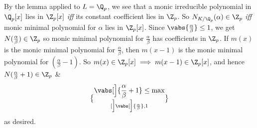 By the lemma applied to $L=\Q_p$, we see that a monic irreducible polynomial in $\Q_p[x]$ lies in $\Z_p[x]$ \emph{iff} its constant coefficient lies in $\Z_p$.  So $N_{K/\Q_p}(\alpha)\in\Z_p$ \emph{iff} monic minimal polynomial for $\alpha$ lies in $\Z_p[x]$.  Since $\vabs{\frac\alpha\beta}\leq1$, we get $N(\frac\alpha\beta)\in\Z_p$ so monic minimal polynomial for $\frac\alpha\beta$ has coefficients in $\Z_p$.  If $m(x)$ is the monic minimal polynomial for $\frac{\alpha}{\beta}$, then $m(x-1)$ is the monic minimal polynomial for $(\frac\alpha\beta-1)$.  So $m(x)\in\Z_p[x]\implies m(x-1)\in\Z_p[x]$, and hence $N(\frac\alpha\beta+1)\in\Z_p$ \&
\[ \vabs[\Big]{\frac\alpha\beta+1} \leq \max\brace[\Big]{\vabs[\Big]{\frac\alpha\beta},1} \]
as desired.

